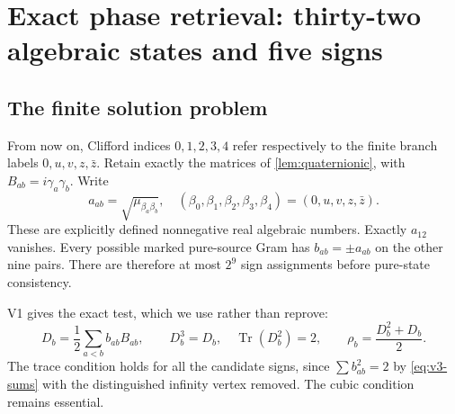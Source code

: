 \documentclass[11pt]{article}
\theoremstyle{definition}
\theoremstyle{remark}
\newcommand{\Tr}{\operatorname{Tr}}
\begin{document}
\section{Exact phase retrieval: thirty-two algebraic states and five signs}
\label{sec:v3-phase-retrieval}

\subsection{The finite solution problem}
From now on, Clifford indices $0,1,2,3,4$ refer respectively to the finite
branch labels $0,u,v,z,\bar z$. Retain exactly the matrices of
\cref{lem:quaternionic}, with $B_{ab}=i\gamma_a\gamma_b$.
Write
\begin{equation}
 a_{ab}=\sqrt{\mu_{\beta_a\beta_b}},\quad
 (\beta_0,\beta_1,\beta_2,\beta_3,\beta_4)=(0,u,v,z,\bar z).
 \label{eq:v3-amplitudes}
\end{equation}
These are explicitly defined nonnegative real algebraic numbers.
Exactly $a_{12}$ vanishes. Every possible marked pure-source Gram has
$b_{ab}=\pm a_{ab}$ on the other nine pairs. There are therefore at most
$2^9$ sign assignments before pure-state consistency.

V1 gives the exact test, which we use rather than reprove:
\begin{equation}
 D_b=\frac12\sum_{a<b}b_{ab}B_{ab},\qquad
 D_b^3=D_b,\quad\Tr(D_b^2)=2,\qquad
 \rho_b=\frac{D_b^2+D_b}{2}.
 \label{eq:v3-cubic-use}
\end{equation}
The trace condition holds for all the candidate signs, since
$\sum b_{ab}^2=2$ by \eqref{eq:v3-sums} with the distinguished infinity
vertex removed. The cubic condition remains essential.
\end{document}
